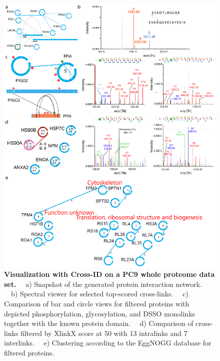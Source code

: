 \begin{figure}[!htb]
  \center
  \includegraphics[]{Chapter.2/Figures/f3.png}
  \caption{
    \textbf{Visualization with Cross-ID on a PC9 whole proteome data set.} ~~a) Snapshot of the generated protein interaction network. ~~b) Spectral viewer for selected top-scored cross-links. ~~c) Comparison of bar and circle views for filtered proteins with depicted phosphorylation, glycosylation, and DSSO monolinks together with the known protein domain. ~~d) Comparison of cross-links filtered by XlinkX score at 50 with 13 intralinks and 7 interlinks. ~~e) Clustering according to the EggNOGG database for filtered proteins.
  }
  \label{fig:fig2.3}
\end{figure}


